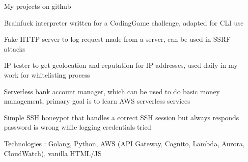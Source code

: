 \begin{cventries}
  \cventry
  {}
  {My projects on github}
  {}
  {}
  {
    \begin{cvitems}
      \item {Brainfuck interpreter written for a CodingGame challenge, adapted for CLI use}
      \item {Fake HTTP server to log request made from a server, can be used in SSRF attacks}
      \item {IP tester to get geolocation and reputation for IP addresses, used daily in my work for whitelisting process}
      \item {Serverless bank account manager, which can be used to do basic money management, primary goal is to learn AWS serverless services}
      \item {Simple SSH honeypot that handles a correct SSH session but always responds password is wrong while logging credentials tried}
      \item {Technologies : Golang, Python, AWS (API Gateway, Cognito, Lambda, Aurora, CloudWatch), vanilla HTML/JS}
    \end{cvitems}
  }
\end{cventries}